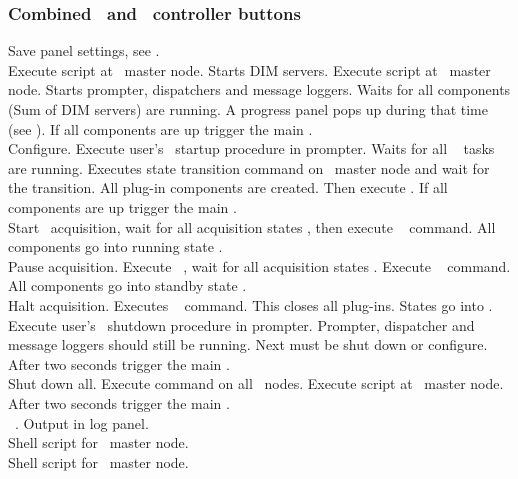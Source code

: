 \subsubsection[Combined DABC and MBS  controller buttons]{Combined \dabc\ and \mbs\  controller buttons}
 Save panel settings, see .\\
  Execute script  at \dabc\ master node.
Starts DIM servers.
Execute script  at \mbs\ master node.
Starts prompter, dispatchers and message loggers.
Waits for all components (Sum of DIM servers) are running.
A progress panel pops up during that time
(see ).
If all components are up trigger the main .\\
 Configure. Execute user's \mbs\ startup procedure in prompter.
Waits for all \mbs\  tasks are running.
Executes state transition command 
on \dabc\ master node and wait for the transition.
All plug-in components are created. Then execute .
If all components are up trigger the main .\\
 Start \mbs\ acquisition, 
wait for all
acquisition states , then execute \dabc\  command.
All components go into running state .\\
 Pause acquisition. Execute \mbs\ ,
wait for all
acquisition states .
Execute \dabc\  command.
All components go into standby state .\\
 Halt acquisition. Executes \dabc\  command.
This closes all plug-ins. States go into . 
Execute user's \mbs\ shutdown procedure in prompter.
Prompter, dispatcher and message loggers should still be running.
Next must be shut down or configure.
After two seconds trigger the main .\\
 Shut down all. Execute  command on all \dabc\ nodes.
Execute script  at \mbs\ master node.
After two seconds trigger the main .\\
 \mbs\ . Output in log panel.\\
 Shell script for \mbs\ master node.\\
 Shell script for \dabc\ master node.

